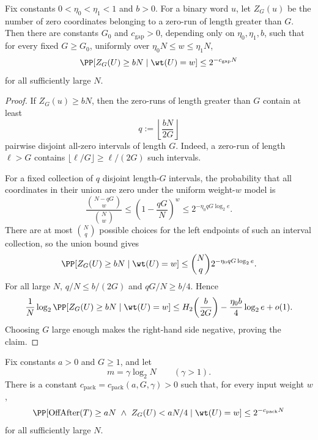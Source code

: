 \begin{lemma}
\label{lem:dense-long-gap-mass}
Fix constants \(0<\eta_0<\eta_1<1\) and \(b>0\). For a binary word \(u\), let \(Z_G(u)\) be the number of zero
coordinates belonging to a zero-run of length greater than \(G\). Then there are constants \(G_0\) and
\(c_{\mathrm{gap}}>0\), depending only on \(\eta_0,\eta_1,b\), such that for every fixed \(G\ge G_0\), uniformly over
\(\eta_0N\le w\le \eta_1N\),
\[
\PP[Z_G(U)\ge bN\mid \wt(U)=w]
\le
2^{-c_{\mathrm{gap}}N}
\]
for all sufficiently large \(N\).
\end{lemma}

\begin{proof}
If \(Z_G(u)\ge bN\), then the zero-runs of length greater than \(G\) contain at least
\[
q:=\left\lfloor \frac{bN}{2G}\right\rfloor
\]
pairwise disjoint all-zero intervals of length \(G\). Indeed, a zero-run of length \(\ell>G\) contains
\(\lfloor \ell/G\rfloor\ge \ell/(2G)\) such intervals.

For a fixed collection of \(q\) disjoint length-\(G\) intervals, the probability that all coordinates in their union
are zero under the uniform weight-\(w\) model is
\[
\frac{\binom{N-qG}{w}}{\binom{N}{w}}
\le
\left(1-\frac{qG}{N}\right)^w
\le
2^{-\eta_0 qG\log_2 e}.
\]
There are at most \(\binom{N}{q}\) possible choices for the left endpoints of such an interval collection, so the union
bound gives
\[
\PP[Z_G(U)\ge bN\mid \wt(U)=w]
\le
\binom{N}{q}2^{-\eta_0 qG\log_2 e}.
\]
For all large \(N\), \(q/N\le b/(2G)\) and \(qG/N\ge b/4\). Hence
\[
\frac1N\log_2 \PP[Z_G(U)\ge bN\mid \wt(U)=w]
\le
H_2\!\left(\frac{b}{2G}\right)-\frac{\eta_0 b}{4}\log_2 e+o(1).
\]
Choosing \(G\) large enough makes the right-hand side negative, proving the claim.
\end{proof}

\begin{lemma}
\label{lem:dense-short-gap-witness-packing}
Fix constants \(a>0\) and \(G\ge 1\), and let
\[
m=\gamma\log_2 N
\qquad(\gamma>1).
\]
There is a constant \(c_{\mathrm{pack}}=c_{\mathrm{pack}}(a,G,\gamma)>0\) such that, for every input weight \(w\),
\[
\PP[\mathrm{OffAfter}(T)\ge aN\ \wedge\ Z_G(U)<aN/4\mid \wt(U)=w]
\le
2^{-c_{\mathrm{pack}}N}
\]
for all sufficiently large \(N\).
\end{lemma}

